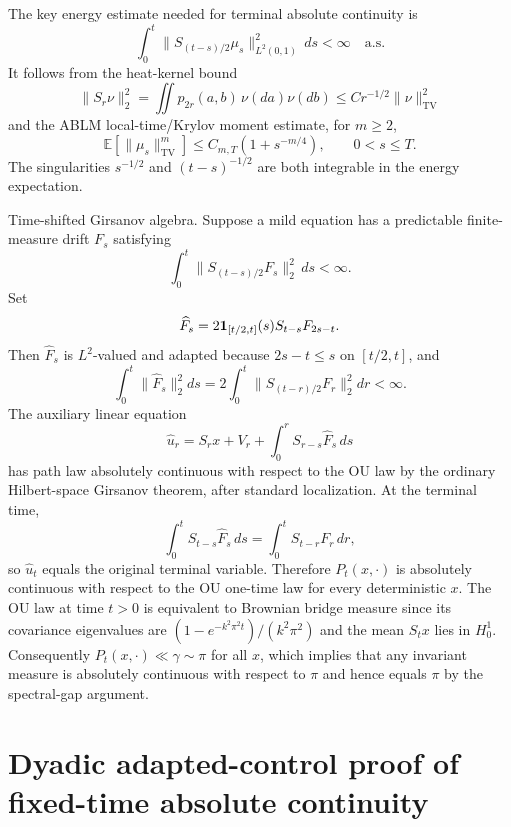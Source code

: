 \documentclass[12pt]{article}
\begin{document}
The key energy estimate needed for terminal absolute continuity is
\[
  \int_0^t\|S_{(t-s)/2}\mu_s\|_{L^2(0,1)}^2\,ds<\infty\quad\text{a.s.}
\]
It follows from the heat-kernel bound
\[
  \|S_r\nu\|_2^2=\iint p_{2r}(a,b)\,\nu(da)\nu(db)
     \le C r^{-1/2}\|\nu\|_{\mathrm{TV}}^2
\]
and the ABLM local-time/Krylov moment estimate, for $m\ge2$,
\[
  \mathbb E[\|\mu_s\|_{\mathrm{TV}}^m]\le C_{m,T}(1+s^{-m/4}),\qquad
  0<s\le T .
\]
The singularities $s^{-1/2}$ and $(t-s)^{-1/2}$ are both integrable in
the energy expectation.

Time-shifted Girsanov algebra.  Suppose a mild equation has a predictable
finite-measure drift $F_s$ satisfying
\[
  \int_0^t\|S_{(t-s)/2}F_s\|_2^2\,ds<\infty .
\]
Set
\[
  \widehat F_s=2{\bf1}_{[t/2,t]}(s)S_{t-s}F_{2s-t}.
\]
Then $\widehat F_s$ is $L^2$-valued and adapted because $2s-t\le s$ on
$[t/2,t]$, and
\[
  \int_0^t\|\widehat F_s\|_2^2ds
  =2\int_0^t\|S_{(t-r)/2}F_r\|_2^2dr<\infty .
\]
The auxiliary linear equation
\[
  \widehat u_r=S_rx+V_r+\int_0^rS_{r-s}\widehat F_s\,ds
\]
has path law absolutely continuous with respect to the OU law by the
ordinary Hilbert-space Girsanov theorem, after standard localization.
At the terminal time,
\[
  \int_0^tS_{t-s}\widehat F_s\,ds
  =\int_0^tS_{t-r}F_r\,dr,
\]
so $\widehat u_t$ equals the original terminal variable.  Therefore
$P_t(x,\cdot)$ is absolutely continuous with respect to the OU one-time
law for every deterministic $x$.  The OU law at time $t>0$ is equivalent
to Brownian bridge measure since its covariance eigenvalues are
$(1-e^{-k^2\pi^2t})/(k^2\pi^2)$ and the mean $S_tx$ lies in $H_0^1$.
Consequently $P_t(x,\cdot)\ll\gamma\sim\pi$ for all $x$, which implies
that any invariant measure is absolutely continuous with respect to
$\pi$ and hence equals $\pi$ by the spectral-gap argument.



\section*{Dyadic adapted-control proof of fixed-time absolute continuity}
\end{document}
